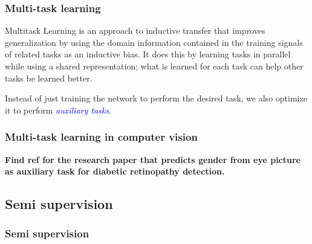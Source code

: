 \documentclass[10pt]{beamer}
\begin{document}
\begin{frame}
  \frametitle{Multi-task learning}

  \begin{displayquote}
    Multitask Learning is an approach to inductive transfer that
    improves generalization by using the domain information contained
    in the training signals of related tasks as an inductive bias. It
    does this by learning tasks in parallel while using a shared
    representation; what is learned for each task can help other tasks
    be learned better.
  \end{displayquote}

  \bigskip

  Instead of just training the network to perform the desired task, we
  also optimize it to perform \textcolor{blue}{\emph{auxiliary
      tasks}}.
\end{frame}

\begin{frame}
  \frametitle{Multi-task learning in computer vision}

  \textbf{Find ref for the research paper that predicts gender from
    eye picture as auxiliary task for diabetic retinopathy detection.}
\end{frame}

\subsection{Semi supervision}

\begin{frame}

  \frametitle{Semi supervision}


\end{frame}

\end{document}
